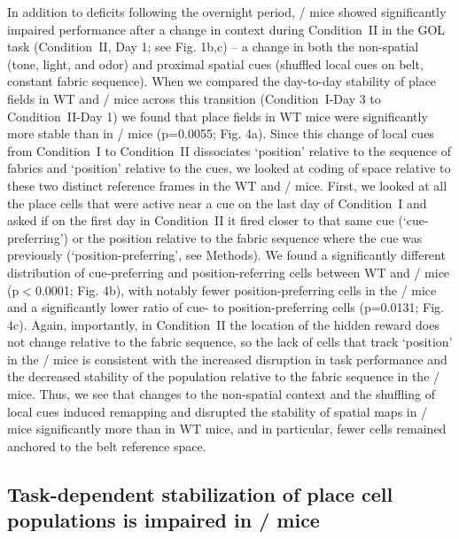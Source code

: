 In addition to deficits following the overnight period, \df/ mice showed significantly impaired performance after a change in context during Condition~II in the GOL task (Condition~II, Day 1; see Fig. 1b,c) – a change in both the non-spatial (tone, light, and odor) and proximal spatial cues (shuffled local cues on belt, constant fabric sequence). When we compared the day-to-day stability of place fields in WT and \df/ mice across this transition (Condition~I-Day 3 to Condition~II-Day 1) we found that place fields in WT mice were significantly more stable than in \df/ mice (p=0.0055; Fig. 4a). Since this change of local cues from Condition~I to Condition~II dissociates ‘position’ relative to the sequence of fabrics and ‘position’ relative to the cues, we looked at coding of space relative to these two distinct reference frames in the WT and \df/ mice. First, we looked at all the place cells that were active near a cue on the last day of Condition~I and asked if on the first day in Condition~II it fired closer to that same cue (‘cue-preferring’) or the position relative to the fabric sequence where the cue was previously (‘position-preferring’, see Methods). We found a significantly different distribution of cue-preferring and position-referring cells between WT and \df/ mice (p$<$0.0001; Fig. 4b), with notably fewer position-preferring cells in the \df/ mice and a significantly lower ratio of cue- to position-preferring cells (p=0.0131; Fig. 4c). Again, importantly, in Condition~II the location of the hidden reward does not change relative to the fabric sequence, so the lack of cells that track ‘position’ in the \df/ mice is consistent with the increased disruption in task performance and the decreased stability of the population relative to the fabric sequence in the \df/ mice. Thus, we see that changes to the non-spatial context and the shuffling of local cues induced remapping and disrupted the stability of spatial maps in \df/ mice significantly more than in WT mice, and in particular, fewer cells remained anchored to the belt reference space.

\subsection{Task-dependent stabilization of place cell populations is impaired in \df/ mice}

